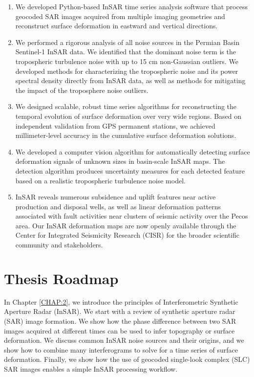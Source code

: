 \begin{enumerate}
	
	\item We developed Python-based InSAR time series analysis software that process geocoded SAR images acquired from multiple imaging geometries and reconstruct surface deformation in eastward and vertical directions.
	
	\item We performed a rigorous analysis of all noise sources in the Permian Basin Sentinel-1 InSAR data. We identified that the dominant noise term is the tropospheric turbulence noise with up to 15 cm non-Gaussian outliers. We developed methods for characterizing the tropospheric noise and its power spectral density directly from InSAR data, as well as methods for mitigating the impact of the troposphere noise outliers.
	
	\item We designed scalable, robust time series algorithms for reconstructing the temporal evolution of surface deformation over very wide regions. Based on independent validation from GPS permanent stations, we achieved millimeter-level accuracy in the cumulative surface deformation solutions.
	
	\item We developed a computer vision algorithm for automatically detecting surface deformation signals of unknown sizes in basin-scale InSAR maps. The detection algorithm produces uncertainty measures for each detected feature based on a realistic tropospheric turbulence noise model.
	
	\item InSAR reveals numerous subsidence and uplift features near active production and disposal wells, as well as linear deformation patterns associated with fault activities near clusters of seismic activity over the Pecos area. Our InSAR deformation maps are now openly available through the Center for Integrated Seismicity Research (CISR) for the broader scientific community and stakeholders. 
	
	
\end{enumerate}


\section{Thesis Roadmap}
\label{sec:chap1-roadmap}


In Chapter \ref{CHAP:2}, we introduce the principles of Interferometric Synthetic Aperture Radar (InSAR). We start with a review of synthetic aperture radar (SAR) image formation. We show how the phase difference between two SAR images acquired at different times can be used to infer topography or surface deformation. We discuss common InSAR noise sources and their origins, and we show how to combine many interferograms to solve for a time series of surface deformation. Finally, we show how the use of geocoded single-look complex (SLC) SAR images enables a simple InSAR processing workflow. 


